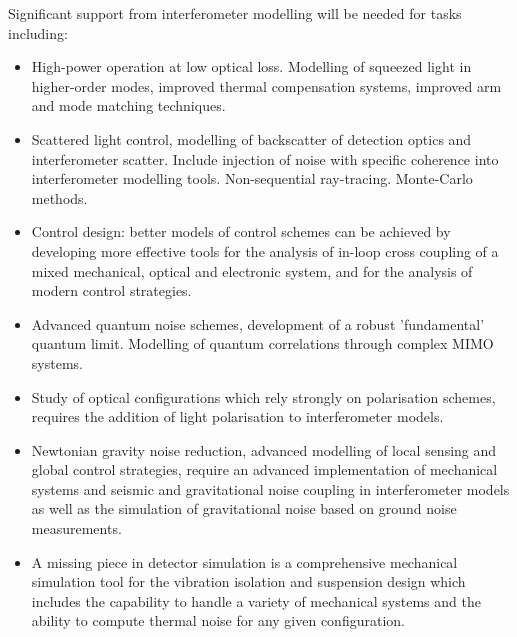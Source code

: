 Significant support from interferometer modelling will be needed for tasks including:
\begin{itemize}
\item High-power operation at low optical loss.
Modelling of squeezed light in higher-order modes, improved thermal compensation systems, improved arm and mode matching techniques.
\item Scattered light control, modelling of backscatter of detection optics and interferometer scatter. Include injection of noise with specific coherence into interferometer modelling tools. Non-sequential ray-tracing. Monte-Carlo methods.
\item Control design: better models of control schemes can be achieved by developing more effective tools for the analysis of in-loop cross coupling of a mixed mechanical, optical and electronic system, and for the analysis of modern
control strategies.
\item Advanced quantum noise schemes, development of a robust 'fundamental' quantum limit. Modelling of quantum correlations through complex \ac{MIMO}  systems.
\item Study of optical configurations which rely strongly on polarisation schemes, requires the addition of light polarisation to interferometer models.
\item Newtonian gravity noise reduction, advanced modelling of local sensing and global control strategies, require an advanced implementation of mechanical systems and seismic and gravitational noise coupling in interferometer models as well as the simulation of gravitational noise based on ground noise measurements.
\item A missing piece in detector simulation is a comprehensive mechanical simulation tool for the vibration isolation and suspension design which includes the capability to handle a variety of mechanical systems and the ability to compute thermal noise for any given configuration.
\end{itemize}

